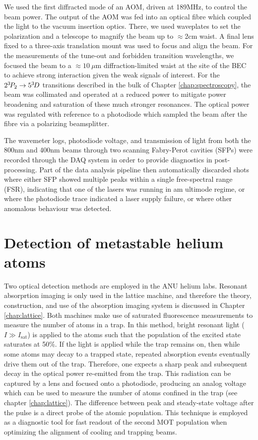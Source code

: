 	We used the first diffracted mode of an AOM, driven at 189MHz, to control the beam power.
	The output of the AOM was fed into an optical fibre which coupled the light to the vacuum insertion optics.
	There, we used waveplates to set the polarization and a telescope to magnify the beam up to $\approx$2cm waist.
	A final lens fixed to a three-axis translation mount was used to focus and align the beam.
	For the measurements of the tune-out and forbidden transition wavelengths, we focused the beam to a $\approx 10~\mu$m diffraction-limited waist at the site of the BEC to achieve strong interaction given the weak signals of interest.
	For the $2^{3\!} P_2\rightarrow 5^{3\!} D$ transitions described in the bulk of Chapter \ref{chap:spectroscopy}, the beam was collimated and operated at a reduced power to mitigate power broadening and saturation of these much stronger resonances.
	The optical power was regulated with reference to a photodiode which sampled the beam after the fibre via a polarizing beamsplitter.

	The wavemeter logs, photodiode voltage, and transmission of light from both the 800nm and 400nm beams through two scanning Fabry-Perot cavities (SFPs) were recorded through the DAQ system in order to provide diagnostics in post-processing.
	Part of the data analysis pipeline then automatically discarded shots where either SFP showed multiple peaks within a single free-spectral range (FSR), indicating that one of the lasers was running in am ultimode regime, or where the photodiode trace indicated a laser supply failure, or where other anomalous behaviour was detected.



\section{Detection of metastable helium atoms}
\label{sec:he_detection}
	Two optical detection methods are employed in the ANU helium labs.
	Resonant absorprtion imaging is only used in the lattice machine, and therefore the theory, construction, and use of the absorption imaging system is discussed in Chapter \ref{chap:lattice}.
	Both machines make use of saturated fluorescence measurements to measure the number of atoms in a trap.
	In this method, bright resonant light ($I\gg I_\textrm{sat}$) is applied to the atoms such that the population of the excited state saturates at 50\%.
	If the light is applied while the trap remains on, then while some atoms may decay to a trapped state, repeated absorption events eventually drive them out of the trap.
	Therefore, one expects a sharp peak and subsequent decay in the optical power re-emitted from the trap.
	This radiation can be captured by a lens and focused onto a photodiode, producing an analog voltage which can be used to measure the number of atoms confined in the trap (see chapter \ref{chap:lattice}).
	The difference between peak and steady-state voltage after the pulse is a direct probe of the atomic population.
	This technique is employed as a diagnostic tool for fast readout of the second MOT population when optimizing the alignment of cooling and trapping beams. 


